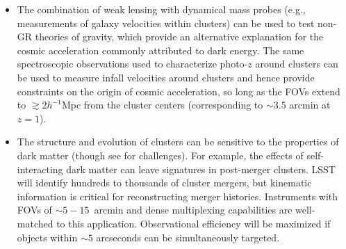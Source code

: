 \begin{itemize}
\item The combination of weak lensing with dynamical mass probes (e.g., measurements of galaxy
  velocities within clusters) can be used to test non-GR theories of gravity, which provide an
  alternative explanation for the cosmic acceleration commonly attributed to dark energy. The same
  spectroscopic observations used to characterize photo-$z$ around clusters can be used to measure infall velocities around clusters and hence provide constraints on the origin of cosmic acceleration, so long as the FOVs extend to $\gtrsim 2h^{-1}$Mpc from the cluster centers (corresponding to $\sim 3.5$ arcmin at $z=1$).

\item The structure
and evolution of clusters can be sensitive to the properties of dark matter (though see 
\citealt{Peter} for challenges). For example, the
effects of self-interacting dark matter can leave signatures in post-merger clusters.  LSST will
identify hundreds to thousands of cluster mergers, %
but kinematic
information is critical for reconstructing  merger histories.
Instruments with FOVs of $\sim 5-15$~arcmin and dense multiplexing capabilities are
well-matched to this application. Observational efficiency will be maximized if objects within
$\sim5$ arcseconds can be simultaneously targeted. 
\end{itemize}

